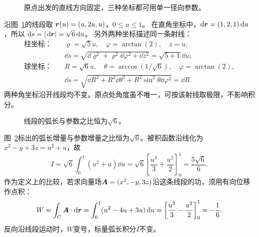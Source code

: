 \begin{figure}[H]\centering
{}
\caption{原点出发的直线方向固定，三种坐标都可用单一径向参数。}\label{fig:c4-e1-q}
\end{figure}
\begin{solution}
沿图~\ref{fig:c4-e1-q}的线段取
$\bm{r}(u)=(u,2u,u)$，$0\le u\le1$。
在直角坐标中，$\mathop{}\!\mathrm d\bm{r}=(1,2,1)\mathop{}\!\mathrm d u$，所以
$\mathop{}\!\mathrm d s=|\mathop{}\!\mathrm d\bm{r}|=\sqrt6\mathop{}\!\mathrm d u$。
另外两种坐标描述同一条射线：
\[
 \begin{aligned}
 \text{柱坐标：}\quad&
 \varrho=\sqrt5u,\quad\varphi=\arctan(2),\quad z=u,\\
 &\dd s=\sqrt{\dd\varrho^2+\varrho^2\dd\varphi^2+\dd z^2}
 =\sqrt{5+1}\dd u;\\
 \text{球坐标：}\quad&
 R=\sqrt6u,\quad\theta=\arccos(1/\sqrt6),\quad
 \varphi=\arctan(2),\\
 &\dd s=\sqrt{\dd R^2+R^2\dd\theta^2+
 R^2\sin^2\theta\dd\varphi^2}=\dd R.
 \end{aligned}
\]
两种角坐标沿开线段均不变。原点处角度虽不唯一，可按该射线取极限，不影响积分。
\begin{figure}[H]\centering
{}
\caption{线段的弧长与参数之比恒为$\sqrt6$。}\label{fig:c4-e1-s}
\end{figure}
图~\ref{fig:c4-e1-s}标出的弧长增量与参数增量之比恒为$\sqrt6$。被积函数沿线化为
$x^2-y+3z=u^2+u$，故
\[
 \boxed{I=\sqrt6\int_0^1(u^2+u)\dd u
 =\sqrt6\left[\frac{u^3}{3}+\frac{u^2}{2}\right]_0^1
 =\frac{5\sqrt6}{6}}.
\]
作为定义上的比较，若求向量场$\bm{A}=(x^2,-y,3z)$沿这条线段的功，须用有向位移作点积：
\[
 W=\int_C\bm{A}\cdot\mathop{}\!\mathrm d\bm{r}
 =\int_0^1(u^2-4u+3u)\mathop{}\!\mathrm d u
 =\left[\frac{u^3}{3}-\frac{u^2}{2}\right]_0^1=-\frac16.
\]
反向沿线段运动时，$W$变号，标量弧长积分$I$不变。
\end{solution}

